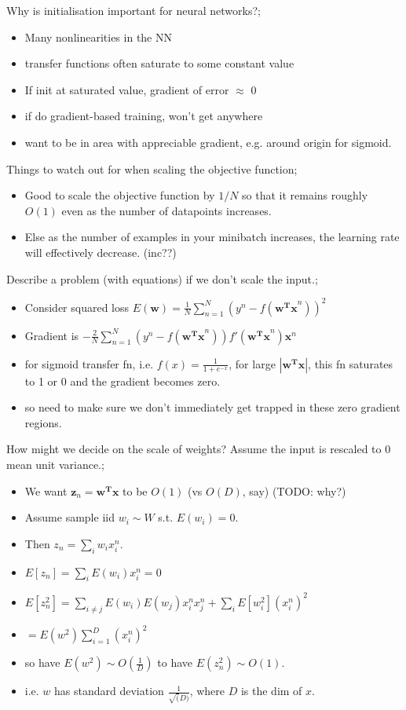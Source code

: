 \documentclass{article}
\begin{document}
Why is initialisation important for neural networks?; \begin{itemize} \item Many nonlinearities in the NN \item transfer functions often saturate to some constant value \item If init at saturated value, gradient of error $\approx$ 0 \item if do gradient-based training, won't get anywhere \item want to be in area with appreciable gradient, e.g. around origin for sigmoid. \end{itemize}

Things to watch out for when scaling the objective function; \begin{itemize} \item Good to scale the objective function by $1/N$ so that it remains roughly $O(1)$ even as the number of datapoints increases. \item Else as the number of examples in your minibatch increases, the learning rate will effectively decrease. (inc??) \end{itemize} 

Describe a problem (with equations) if we don't scale the input.; \begin{itemize} \item Consider squared loss $E(\bm{w}) = \frac{1}{N}\sum_{n=1}^N (y^n - f(\bm{w^Tx}^n))^2$ \item Gradient is $-\frac{2}{N}\sum_{n=1}^N(y^n - f(\bm{w^Tx}^n))f'(\bm{w^Tx}^n)\bm{x}^n$ \item for sigmoid transfer fn, i.e. $f(x) = \frac{1}{1+e^{-x}}$, for large $|\mathbf{w^Tx}|$, this fn saturates to 1 or 0 and the gradient becomes zero. \item so need to make sure we don't immediately get trapped in these zero gradient regions. \end{itemize}

How might we decide on the scale of weights? Assume the input is rescaled to 0 mean unit variance.; \begin{itemize} \item We want $\mathbf{z}_n = \mathbf{w^Tx}$ to be $O(1)$ (vs $O(D)$, say) (TODO: why?) \item Assume sample iid $w_i \sim W$ s.t. $E(w_i) = 0$. \item Then $z_n = \sum_i w_i x^n_i$.  \item $E[z_n] = \sum_i E(w_i)x_i^n = 0$ \item $E[z_n^2] = \sum_{i\ne j} E(w_i)E(w_j)x_i^nx_j^n + \sum_i E[w_i^2](x_i^n)^2$ \item $=E(w^2)\sum_{i=1}^D(x_i^n)^2$ \item so have $E(w^2) \sim O(\frac{1}{D})$ to have $E(z_n^2)\sim O(1)$. \item i.e. $w$ has standard deviation $\frac{1}{\sqrt(D)}$, where $D$ is the dim of $x$. \end{itemize}
\end{document}
